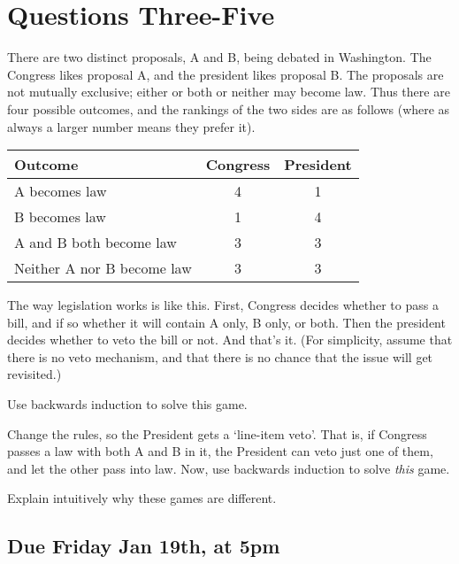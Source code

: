 \documentclass[11pt]{article}
\begin{document}
\newpage

\section*{Questions Three-Five}

There are two distinct proposals, A and B, being debated in Washington. The Congress likes proposal A, and the president likes proposal B. The proposals are not mutually exclusive; either or both or neither may become law. Thus there are four possible outcomes, and the rankings of the two sides are as follows (where as always a larger number means they prefer it).

\bigskip

\begin{center}
\begin{tabular}{l c c}
\textbf{Outcome} & \textbf{Congress} & \textbf{President} \\ \hline
A becomes law & 4 & 1 \\
B becomes law & 1 & 4 \\
A and B both become law & 3 & 3 \\
Neither A nor B become law & 3 & 3 \\
\end{tabular}
\end{center}

\bigskip
\noindent The way legislation works is like this. First, Congress decides whether to pass a bill, and if so whether it will contain A only, B only, or both. Then the president decides whether to veto the bill or not. And that's it. (For simplicity, assume that there is no veto mechanism, and that there is no chance that the issue will get revisited.)

\begin{enumerate*}
\setcounter{enumi}{2}
\item Use backwards induction to solve this game.
\item Change the rules, so the President gets a `line-item veto'. That is, if Congress passes a law with both A and B in it, the President can veto just one of them, and let the other pass into law. Now, use backwards induction to solve \textit{this} game.
\item Explain intuitively why these games are different.
\end{enumerate*}

\subsection*{Due Friday Jan 19th, at 5pm}
\end{document}
